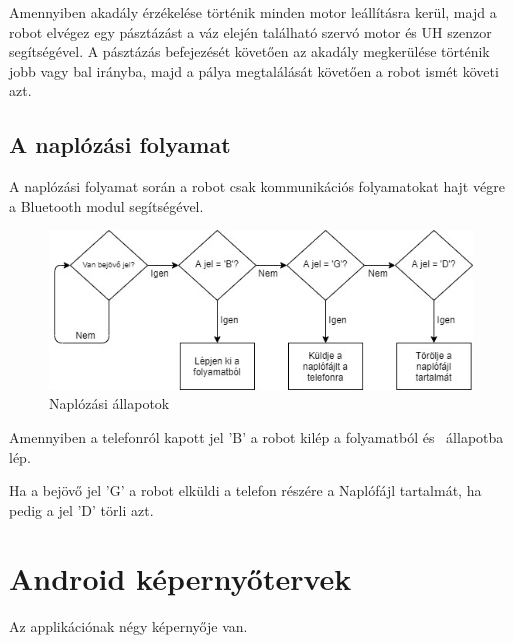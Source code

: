 \documentclass[]{thesis-ekf}
\theoremstyle{definition}
\begin{document}
Amennyiben akadály érzékelése történik minden motor leállításra kerül, majd a robot elvégez egy pásztázást a váz elején található szervó motor és UH szenzor segítségével. A pásztázás befejezését követően az akadály megkerülése történik jobb vagy bal irányba, majd a pálya megtalálását követően a robot ismét követi azt.
\subsection{A naplózási folyamat}\label{naplokepernyo_allapot}
A naplózási folyamat során a robot csak kommunikációs folyamatokat hajt végre a Bluetooth modul segítségével.\begin{figure}[h]
	\centering
	\includegraphics[width=\columnwidth]{images/grafok/log_graf}
	\caption{Naplózási állapotok}
	\label{log_graf}
\end{figure}

Amennyiben a telefonról kapott jel 'B' a robot kilép a folyamatból és \az{\ref{start_allapot}}~állapotba lép.

Ha a bejövő jel 'G' a robot elküldi a telefon részére a Naplófájl tartalmát, ha pedig a jel 'D' törli azt.
\section{Android képernyőtervek}
Az applikációnak négy képernyője van.
\end{document}
